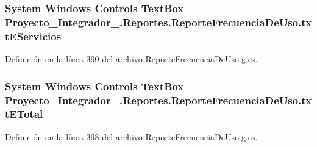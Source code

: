\hypertarget{class_proyecto___integrador__3_1_1_reportes_1_1_reporte_frecuencia_de_uso_a22182387460111695b414013af099899}{
\subsubsection[{txt\-E\-Servicios}]{\setlength{\rightskip}{0pt plus 5cm}System Windows Controls Text\-Box Proyecto\-\_\-\-Integrador\-\_.\-Reportes.\-Reporte\-Frecuencia\-De\-Uso.\-txt\-E\-Servicios\hspace{0.3cm}{\ttfamily [package]}}}\label{class_proyecto___integrador__3_1_1_reportes_1_1_reporte_frecuencia_de_uso_a22182387460111695b414013af099899}


Definición en la línea 390 del archivo Reporte\-Frecuencia\-De\-Uso.\-g.\-cs.

\hypertarget{class_proyecto___integrador__3_1_1_reportes_1_1_reporte_frecuencia_de_uso_a889f0abb3a420a38d963de4e364ef744}{
\subsubsection[{txt\-E\-Total}]{\setlength{\rightskip}{0pt plus 5cm}System Windows Controls Text\-Box Proyecto\-\_\-\-Integrador\-\_.\-Reportes.\-Reporte\-Frecuencia\-De\-Uso.\-txt\-E\-Total\hspace{0.3cm}{\ttfamily [package]}}}\label{class_proyecto___integrador__3_1_1_reportes_1_1_reporte_frecuencia_de_uso_a889f0abb3a420a38d963de4e364ef744}


Definición en la línea 398 del archivo Reporte\-Frecuencia\-De\-Uso.\-g.\-cs.

